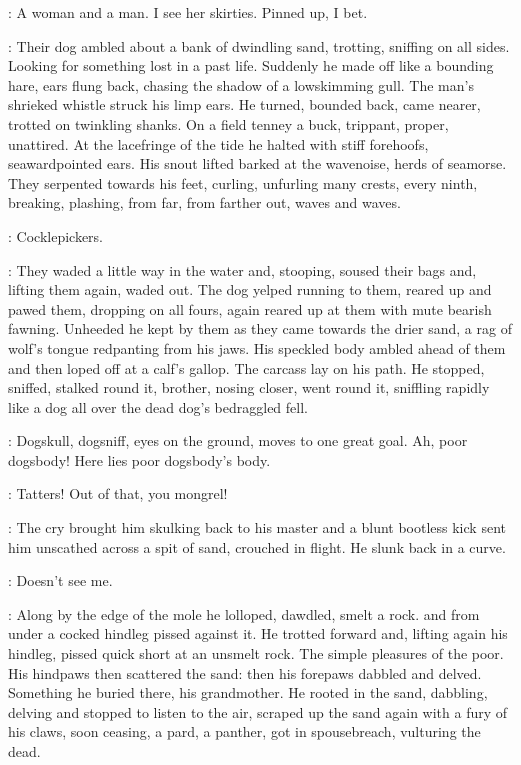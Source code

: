 \StephenInt:
A woman and a man.
I see her skirties.
Pinned up, I bet.

:
Their dog ambled about a bank of dwindling sand,
trotting, sniffing on all sides.
Looking for something lost in a past life.
Suddenly he made off like a bounding hare,
ears flung back, chasing the shadow of a lowskimming gull.
The man's shrieked whistle struck his limp ears.
He turned, bounded back, came nearer, trotted on twinkling shanks.
On a field tenney
a buck, trippant, proper, unattired.
At the lacefringe of the tide
he halted with stiff forehoofs, seawardpointed ears.
His snout lifted
barked at the wavenoise, herds of seamorse.
They serpented towards his feet,
curling, unfurling many crests,
every ninth,
breaking, plashing,
from far,
from farther out,
waves and waves.

\StephenInt:
Cocklepickers.

:
They waded a little way in the water and, stooping,
soused their bags and, lifting them again, waded out.
The dog yelped
running to them,
reared up and pawed them,
dropping on all fours,
again reared up at them with mute bearish fawning.
Unheeded
he kept by them
as they came towards the drier sand,
a rag of wolf's tongue redpanting from his jaws.
His speckled body ambled ahead of them
and then loped off at a calf's gallop.
The carcass lay on his path.
He stopped, sniffed, stalked round it,
brother, nosing closer, went round it,
sniffling rapidly like a dog
all over the dead dog's bedraggled fell.

\StephenInt:
Dogskull, dogsniff,
eyes on the ground,
moves to one great goal.
Ah, poor dogsbody!
Here lies poor dogsbody's body.

\man:
Tatters!
Out of that, you mongrel!

:
The cry brought him skulking back to his master
and a blunt bootless kick sent him unscathed
across a spit of sand, crouched in flight.
He slunk back in a curve.

\StephenInt:
Doesn't see me.

:
Along by the edge of the mole
he lolloped, dawdled, smelt a rock.
and from under a cocked hindleg
pissed against it.
He trotted forward and, lifting again his hindleg,
pissed quick short at an unsmelt rock.
The simple pleasures of the poor.
His hindpaws then scattered the sand:
then his forepaws dabbled and delved.
Something he buried there, his grandmother.
He rooted in the sand,
dabbling, delving
and stopped to listen to the air,
scraped up the sand
again with a fury of his claws,
soon ceasing, a pard, a panther,
got in spousebreach,
vulturing the dead.

